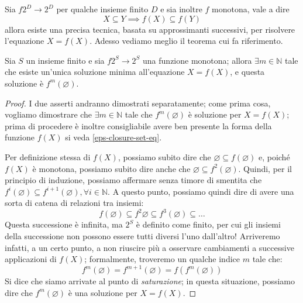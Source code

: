 \documentclass[class=book, crop=false, oneside, 12pt]{standalone}
\begin{document}
Sia \(f 2^D \to 2^D\) per qualche insieme finito \(D\) e sia inoltre \( f \) monotona, vale a dire
\begin{equation*}
    X \subseteq Y \implies f(X) \subseteq f(Y)
\end{equation*}
allora esiste una precisa tecnica, basata su approssimanti successivi, per risolvere l'equazione \(X = f(X)\). Adesso vediamo meglio il teorema cui fa riferimento.

\begin{theorem}
    Sia \(S\) un insieme finito e sia \(f 2^S \to 2^S\) una funzione monotona; allora \(\exists m \in \mathbb{N}\) tale che esiste un'unica soluzione minima all'equazione \(X = f(X)\), e questa soluzione è \(f^m(\varnothing)\).
\end{theorem}

\begin{proof}
    I due asserti andranno dimostrati separatamente; come prima cosa, vogliamo dimostrare che \(\exists m \in \mathbb{N}\) tale che \(f^m(\varnothing)\) è soluzione per \(X = f(X)\); prima di procedere è inoltre consigliabile avere ben presente la forma della funzione \(f(X)\) si veda \ref{eps-closure-set-eq}.

    Per definizione stessa di \(f(X)\), possiamo subito dire che \(\varnothing \subseteq f(\varnothing)\) e, poiché \(f(X)\) è monotona, possiamo subito dire anche che \(\varnothing \subseteq f^2(\varnothing)\). Quindi, per il principio di induzione, possiamo affermare senza timore di smentita che \(f^i(\varnothing) \subseteq f^{i + 1}(\varnothing), \forall i \in \mathbb{N} \). A questo punto, possiamo quindi dire di avere una sorta di catena di relazioni tra insiemi:
    \begin{equation*}
        f(\varnothing) \subseteq f^2{\varnothing} \subseteq f^3(\varnothing) \subseteq \ldots
    \end{equation*}
    Questa successione è infinita, ma \(2^S\) è definito come finito, per cui gli insiemi della successione non possono essere tutti diversi l'uno dall'altro! Arriveremo infatti, a un certo punto, a non riuscire più a osservare cambiamenti a successive applicazioni di \(f(X)\); formalmente, troveremo un qualche indice \(m\) tale che:
    \begin{equation*}
        f^m(\varnothing) = f^{m + 1} (\varnothing) = f(f^m(\varnothing))
    \end{equation*}
    Si dice che siamo arrivate al punto di \emph{saturazione}; in questa situazione, possiamo dire che \(f^m(\varnothing)\) è una soluzione per \(X = f(X)\).


\end{proof}
\end{document}
